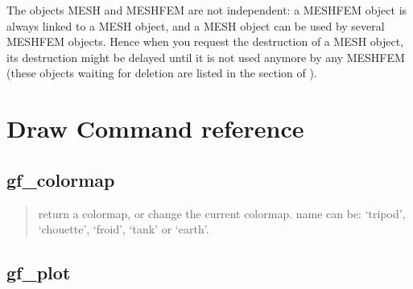 \documentclass[a4paper,11pt,english]{sphinxmanual}
\begin{document}
\sphinxAtStartPar
The objects MESH and MESHFEM are not independent: a MESHFEM object is always
linked to a MESH object, and a MESH object can be used by several MESHFEM
objects. Hence when you request the destruction of a MESH object, its destruction
might be delayed until it is not used anymore by any MESHFEM (these objects
waiting for deletion are listed in the  section of
).


\chapter{Draw Command reference}
\label{\detokenize{scilab/plotcmdref:draw-command-reference}}\label{\detokenize{scilab/plotcmdref:scilab-plotcmdref}}\label{\detokenize{scilab/plotcmdref::doc}}

\section{gf\_colormap}
\label{\detokenize{scilab/plotcmdref:gf-colormap}}
\sphinxAtStartPar
{}

\begin{sphinxVerbatim}[commandchars=\\\{\}]
\end{sphinxVerbatim}

\sphinxAtStartPar
{}
\begin{quote}

\sphinxAtStartPar
return a colormap, or change the current colormap.
name can be: ‘tripod’, ‘chouette’, ‘froid’, ‘tank’
or ‘earth’.
\end{quote}


\section{gf\_plot}
\label{\detokenize{scilab/plotcmdref:gf-plot}}
\sphinxAtStartPar
{}
\end{document}

